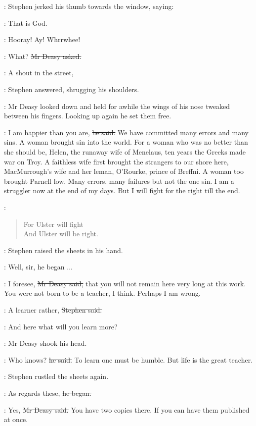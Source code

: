 :
Stephen jerked his thumb towards the window, saying:

\Stephen:
That is God.

\All:
Hooray! Ay! Whrrwhee!

\deasy:
What?
\sout{Mr Deasy asked.}

\Stephen:
A shout in the street,

:
Stephen answered, shrugging his shoulders.

:
Mr Deasy looked down
and held for awhile the wings of his nose
tweaked between his fingers.
Looking up again he set them free.

\deasy:
I am happier than you are, \sout{he said.}
We have committed many errors and many sins.
A woman brought sin into the world.
For a woman who was no better than she should be,
Helen, the runaway wife of Menelaus,
ten years the Greeks made war on Troy.
A faithless wife first brought the strangers to our shore here,
MacMurrough's wife and her leman, O'Rourke, prince of Breffni.
A woman too brought Parnell low.
Many errors, many failures but not the one sin.
I am a struggler now at the end of my days.
But I will fight for the right till the end.

\begin{samepage}
\StephenInt:
\begin{verse}
    For Ulster will fight \\
    And Ulster will be right.
\end{verse}
\end{samepage}

:
Stephen raised the sheets in his hand.

\Stephen:
Well, sir, he began ...

\deasy:
I foresee, \sout{Mr Deasy said,}
that you will not remain here very long at this work.
You were not born to be a teacher, I think.
Perhaps I am wrong.

\Stephen:
A learner rather, \sout{Stephen said.}

\StephenInt:
And here what will you learn more?

:
Mr Deasy shook his head.

\deasy:
Who knows? \sout{he said.}
To learn one must be humble.
But life is the great teacher.

:
Stephen rustled the sheets again.

\Stephen:
As regards these, \sout{he began.}

\deasy:
Yes, \sout{Mr Deasy said.}
You have two copies there.
If you can have them published at once.

